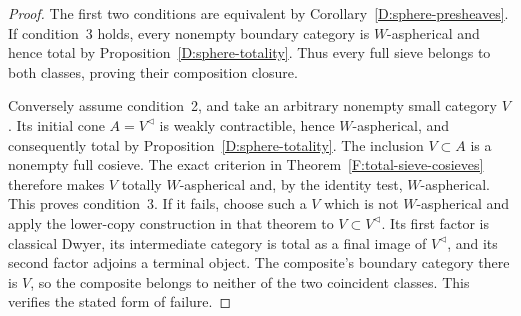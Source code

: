\begin{proof}
The first two conditions are equivalent by
Corollary~\ref{D:sphere-presheaves}. If condition~3
holds, every nonempty boundary category is
$W$-aspherical and hence total by
Proposition~\ref{D:sphere-totality}. Thus every full
sieve belongs to both classes, proving their
composition closure.

Conversely assume condition~2, and take an arbitrary
nonempty small category $V$. Its initial cone
$A=V^{\triangleleft}$ is weakly contractible, hence
$W$-aspherical, and consequently total by
Proposition~\ref{D:sphere-totality}. The inclusion
$V\subset A$ is a nonempty full cosieve.
The exact criterion in
Theorem~\ref{F:total-sieve-cosieves} therefore makes
$V$ totally $W$-aspherical and, by the identity test,
$W$-aspherical. This proves condition~3. If it fails,
choose such a $V$ which is not $W$-aspherical and
apply the lower-copy construction in that theorem
to $V\subset V^{\triangleleft}$. Its first factor
is classical Dwyer, its intermediate category is
total as a final image of $V^{\triangleleft}$, and
its second factor adjoins a terminal object. The
composite's boundary category there is $V$, so the
composite belongs to neither of the two coincident
classes. This verifies the stated form of failure.
\end{proof}

